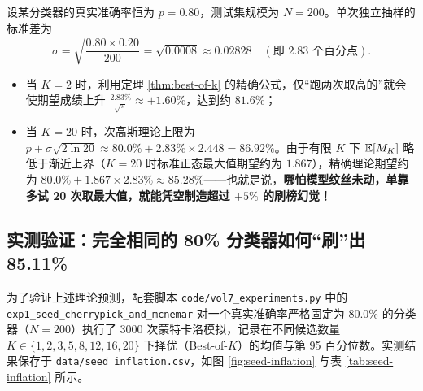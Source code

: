 \begin{example}[手算估算：$N=200$ 时从 20 个随机种子中择优]\label{ex:seed-calc}
设某分类器的真实准确率恒为 $p = 0.80$，测试集规模为 $N = 200$。单次独立抽样的标准差为
\[
  \sigma = \sqrt{\frac{0.80 \times 0.20}{200}} = \sqrt{0.0008} \approx 0.02828 \quad (\text{即 } 2.83\text{ 个百分点}).
\]
\begin{itemize}
  \item 当 $K = 2$ 时，利用定理 \ref{thm:best-of-k} 的精确公式，仅“跑两次取高的”就会使期望成绩上升 $\frac{2.83\%}{\sqrt{\pi}} \approx +1.60\%$，达到约 $81.6\%$；
  \item 当 $K = 20$ 时，次高斯理论上限为 $p + \sigma\sqrt{2\ln 20} \approx 80.0\% + 2.83\% \times 2.448 = 86.92\%$。由于有限 $K$ 下 $\mathbb{E}[M_K]$ 略低于渐近上界（$K=20$ 时标准正态最大值期望约为 $1.867$），精确理论期望约为 $80.0\% + 1.867 \times 2.83\% \approx 85.28\%$——也就是说，\textbf{哪怕模型纹丝未动，单靠多试 20 次取最大值，就能凭空制造超过 $+5\%$ 的刷榜幻觉！}
\end{itemize}
\end{example}

\subsection{实测验证：完全相同的 80\% 分类器如何“刷”出 85.11\%}

为了验证上述理论预测，配套脚本 \texttt{code/vol7\_experiments.py} 中的 \texttt{exp1\_seed\_cherrypick\_and\_mcnemar} 对一个真实准确率严格固定为 $80.0\%$ 的分类器（$N=200$）执行了 $3000$ 次蒙特卡洛模拟，记录在不同候选数量 $K \in \{1,2,3,5,8,12,16,20\}$ 下择优（Best-of-$K$）的均值与第 95 百分位数。实测结果保存于 \texttt{data/seed\_inflation.csv}，如图 \ref{fig:seed-inflation} 与表 \ref{tab:seed-inflation} 所示。

